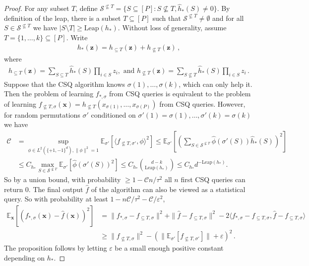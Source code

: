 \documentclass[11pt]{article}
\newcommand{\E}{\mathbb{E}}
\newcommand{\eps}{\varepsilon}
\newcommand{\<}{\langle}
\renewcommand{\>}{\rangle}
\theoremstyle{definition}
\def\bx{{\boldsymbol x}}
\def\bz{{\boldsymbol z}}
\def\hf{{\hat f}}
\def\cC{{\mathcal C}}
\def\cS{{\mathcal S}}
\def\bz{{\boldsymbol z}}
\def\bx{{\boldsymbol x}}
\def\bz{{\boldsymbol z}}
\def\cS{{\mathcal S}}
\def\hf{\hat f}
\def\cC{\mathcal{C}}
\def\eps{\varepsilon}
\def\Leap{\mathrm{Leap}}
\begin{document}
\begin{proof}
For any subset $T$, define $\cS^{\not\subseteq T} = \{S \subseteq [P] : S \not\subseteq T, \hat{h}_*(S) \neq 0\}$. By definition of the leap, there is a subset $T \subseteq [P]$ such that $\cS^{\not\subseteq T} \neq \emptyset$ and for all $S \in \cS^{\not\subseteq T}$ we have $|S \setminus T| \geq \Leap(h_*)$.
Without loss of generality, assume $T = \{1,\ldots,k\} \subseteq [P]$. Write
\begin{align*}
h_*(\bz) = h_{\subseteq T}(\bz) + h_{\not\subseteq T}(\bz)\,,
\end{align*}
where
\begin{align*}
h_{\subseteq T}(\bz) = \sum_{S \subseteq T} \hat{h}_*(S) \prod_{i \in S} z_i, \mbox{ and } h_{\not\subseteq T}(\bz) = \sum_{S \not\subseteq T} \hat{h}_*(S) \prod_{i \in S} z_i\,.
\end{align*}
Suppose that the CSQ algorithm knows $\sigma(1),\ldots,\sigma(k)$, which can only help it. Then the problem of learning $f_{*,\sigma}$ from CSQ queries is equivalent to the problem of learning
$f_{\not\subseteq T,\sigma}(\bx) = h_{\not\subseteq T}(x_{\sigma(1)},\ldots,x_{\sigma(P)})$ from CSQ queries.
However, for random permutations $\sigma'$ conditioned on $\sigma'(1) = \sigma(1),\ldots,\sigma'(k) = \sigma(k)$ we have
\begin{align*}
\cC &= \sup_{\phi \in L^2(\{+1,-1\}^d), \|\phi\|^2 = 1} \E_{\sigma'}[\<f_{\not\subseteq T,\sigma'},\phi\>^2] \leq \E_{\sigma'}\left[\left(\sum_{S \in \cS^{\not\subseteq T}} \hat{\phi}(\sigma'(S)) \hat{h}_*(S)\right)^2 \right] \\
&\leq C_{h_*} \max_{S \in \cS^{\not\subseteq T}} \E_{\sigma'}[\hat{\phi}(\sigma'(S))^2] \leq C_{h_*} \binom{d-k}{\Leap(h_*)} \leq C_{h_*} d^{-\Leap(h_*)}.
\end{align*}
So by a union bound, with probability $\geq 1 - \cC n / \tau^2$ all $n$ first CSQ queries can return 0. The final output $\hat{f}$ of the algorithm can also be viewed as a statistical query. So with probability at least $1 - n\cC / \tau^2 - \cC / \eps^2$,
\begin{align*}
\E_{\bx}[(f_{*,\sigma}(\bx) - \hat{f}(\bx))^2] &= \|f_{*,\sigma} - f_{\subseteq T,\sigma}\|^2 + \|\hf - f_{\subseteq T,\sigma}\|^2 - 2\<f_{*,\sigma} - f_{\subseteq T,\sigma},\hf - f_{\subseteq T,\sigma}\> \\
&\geq \|f_{\not\subseteq T,\sigma}\|^2 -(\|\E_{\sigma'}[f_{\not\subseteq T,\sigma'}]\| + \eps)^2\,.
\end{align*}
The proposition follows by letting $\eps$ be a small enough positive constant depending on $h_*$.
\end{proof}
\end{document}
